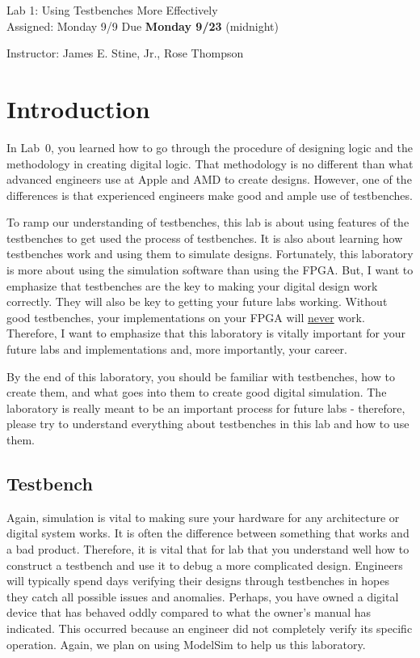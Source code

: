 \documentclass{article}
\newcommand{\myassignment}{Lab 1: Using Testbenches More Effectively}
\newcommand{\myduedate}{Assigned: Monday 9/9 Due \textbf{Monday 9/23} (midnight)}
\newcommand{\myinstructor}{Instructor: James E. Stine, Jr., Rose Thompson}
\begin{document}
\begin{center}
  {\huge \myassignment} \\
  {\large \myduedate} \\
  \begin{flushright}
  \myinstructor \\
  \end{flushright}
\end{center}

\section{Introduction}

In Lab~$0$, you learned how to go through the procedure of
designing logic and the methodology in creating digital logic.  That
methodology is no different than what advanced engineers use at Apple
and AMD to create designs.  However, one of the differences is that experienced
engineers make good and ample use of testbenches.

To ramp our understanding of testbenches, this lab is about using
features of the testbenches to get used the process of
testbenches.  It is also about learning how testbenches work and using
them to simulate designs.  Fortunately, this laboratory is more about using the
simulation software than using the FPGA.  But, I want to emphasize
that testbenches are the key to making your digital design work
correctly.  They will also
be key to getting your future labs working.  Without good
testbenches, your implementations on your FPGA will \underline{never} work.
Therefore, I want to emphasize that this laboratory is vitally important for
your future labs and implementations and, more importantly, your career.

By the end of this laboratory, you should be
familiar with testbenches, how to create them, and what goes into them
to create good digital simulation.  The laboratory is really meant to
be an important process for future labs - therefore, please
try to understand everything about testbenches in this lab and how to
use them.

\subsection{Testbench}

Again, simulation is vital to making sure your hardware for any
architecture or
digital system works.  It is often the difference between something
that works and a bad product.  Therefore, it is
vital that for lab that you understand well how to construct a
testbench and use it to debug a more complicated design.
Engineers will typically spend days verifying their designs through
testbenches in hopes they catch all possible issues and anomalies.
Perhaps, you have owned a digital device that has behaved oddly
compared to what the owner's manual has indicated.  This occurred
because an engineer did not completely verify its specific operation.
Again, we plan on using ModelSim to help us this laboratory.
\end{document}
